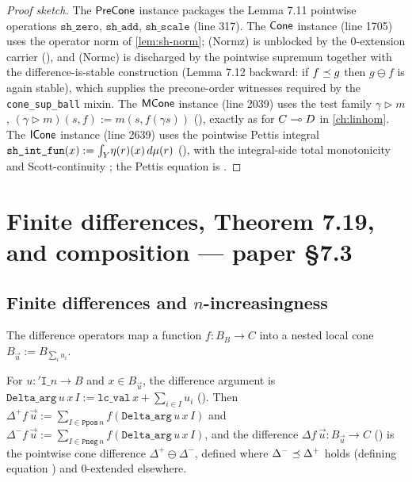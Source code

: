\begin{proof}[Proof sketch]
The $\mathsf{PreCone}$ instance packages the Lemma 7.11 pointwise operations
$\texttt{sh\_zero}$, $\texttt{sh\_add}$, $\texttt{sh\_scale}$ (line
317). The $\mathsf{Cone}$ instance (line 1705) uses the operator norm of
\autoref{lem:sh-norm}; (Normz) is unblocked by the $0$-extension
carrier (), and (Normc) is
discharged by the pointwise supremum
 together with the
difference-is-stable construction
 (Lemma 7.12 backward: if
$f \preceq g$ then $g \ominus f$ is again stable), which supplies the
precone-order witnesses required by the \texttt{cone\_sup\_ball} mixin.
The $\mathsf{MCone}$ instance (line 2039) uses the test family $\gamma
\triangleright m$, $(\gamma \triangleright m)(s, f) := m(s, f(\gamma
s))$ (), exactly as for
$C \multimap D$ in \autoref{ch:linhom}. The $\mathsf{ICone}$ instance (line 2639)
uses the pointwise Pettis integral
$\texttt{sh\_int\_fun}(x) := \int_{Y}\!\eta(r)(x)\,d\mu(r)$
(), with the integral-side
total monotonicity  and
Scott-continuity ; the
Pettis equation is .
\end{proof}

\section{Finite differences, Theorem 7.19, and composition --- paper \S7.3}%
\label{sec:findiff}

\subsection{Finite differences and \texorpdfstring{$n$}{n}-increasingness}

The difference operators map a function $f : B_B \to C$ into a nested
local cone $B_{\vec u} := B_{\sum_i u_i}$.

\begin{definition}\label{def:delta}
\rocqok
{}\rocqok{}
For $u : \mathtt{'I}\_n \to B$ and $x \in B_{\vec u}$, the difference
argument is $\texttt{Delta\_arg}\,u\,x\,I := \texttt{lc\_val}\,x +
\sum_{i \in I} u_i$ (). Then
$\Delta^+ f\,\vec u := \sum_{I \in \texttt{Ppos}\,n} f(\texttt{Delta\_arg}\,u\,x\,I)$
and $\Delta^- f\,\vec u := \sum_{I \in \texttt{Pneg}\,n} f(\texttt{Delta\_arg}\,u\,x\,I)$,
and the difference $\Delta f\,\vec u : B_{\vec u} \to C$
() is the pointwise cone difference
$\Delta^+ \ominus \Delta^-$, defined where $\Delta^- \preceq \Delta^+$
holds (defining equation ) and
$0$-extended elsewhere.
\end{definition}

